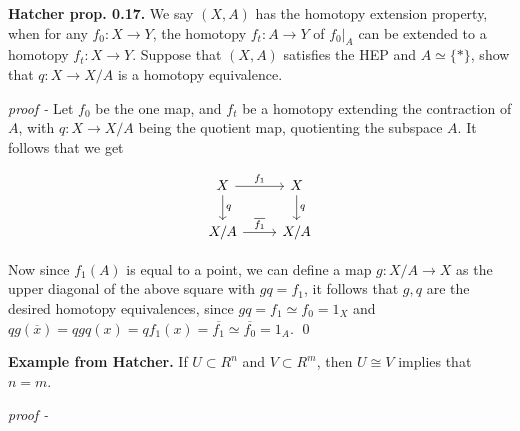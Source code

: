 \documentclass[11pt]{article}
\theoremstyle{definition}
\newcommand{\set}[1]{\{#1\}}
\begin{document}

    \textbf{Hatcher prop. 0.17.} We say \((X,A)\) has the homotopy extension property, when for any \(f_0 : X \to Y\), the homotopy \(f_t : A \to Y\) of \(f_0\vert_A\) can be extended to a homotopy \(f_t: X \to Y\). Suppose that \((X,A)\) satisfies the HEP and \(A \simeq \set{*}\), show that \(q: X \to X/A\) is a homotopy equivalence. 
    
    \emph{proof - } Let \(f_0\) be the one map, and \(f_t\) be a homotopy extending the contraction of \(A\), with \(q: X \to X/A\) being the quotient map, quotienting the subspace \(A\). It follows that we get

    \begin{equation*}
        \begin{tikzcd}
            X \arrow[r,"{f_1}"] \arrow[d,"{q}"] &X \arrow[d,"{q}"] \\
            X/A \arrow[r,"{\overline{f_1}}"] &X/A
        \end{tikzcd}
    \end{equation*}

    Now since \(f_1(A)\) is equal to a point, we can define a map \(g: X/A \to X\) as the upper diagonal of the above square with \(gq = f_1\), it follows that \(g,q\) are the desired homotopy equivalences, since \(gq = f_1 \simeq f_0 = 1_X\) and \(qg(\overline{x}) = qgq(x) = qf_1(x) = \overline{f_1} \simeq \overline{f_0} = 1_A\). \qed


    \textbf{Example from Hatcher.} If \(U \subset R^n\) and \(V \subset R^m\), then \(U \cong V\) implies that \(n = m\).

    \emph{proof - }
    

\end{document}
